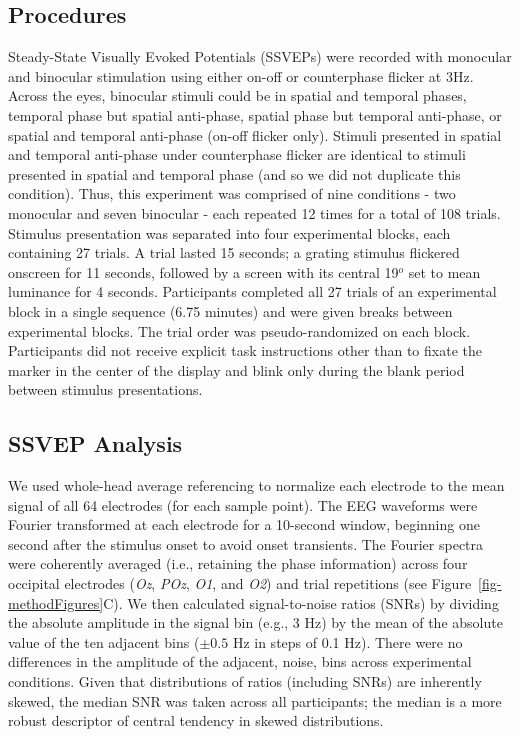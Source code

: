 \documentclass[review,
  12pt,
]{elsarticle}
\begin{document}
\subsection{Procedures}\label{procedures}

Steady-State Visually Evoked Potentials (SSVEPs) were recorded with
monocular and binocular stimulation using either on-off or counterphase
flicker at 3Hz. Across the eyes, binocular stimuli could be in spatial
and temporal phases, temporal phase but spatial anti-phase, spatial
phase but temporal anti-phase, or spatial and temporal anti-phase
(on-off flicker only). Stimuli presented in spatial and temporal
anti-phase under counterphase flicker are identical to stimuli presented
in spatial and temporal phase (and so we did not duplicate this
condition). Thus, this experiment was comprised of nine conditions - two
monocular and seven binocular - each repeated 12 times for a total of
108 trials. Stimulus presentation was separated into four experimental
blocks, each containing 27 trials. A trial lasted 15 seconds; a grating
stimulus flickered onscreen for 11 seconds, followed by a screen with
its central 19\(^o\) set to mean luminance for 4 seconds. Participants
completed all 27 trials of an experimental block in a single sequence
(6.75 minutes) and were given breaks between experimental blocks. The
trial order was pseudo-randomized on each block. Participants did not
receive explicit task instructions other than to fixate the marker in
the center of the display and blink only during the blank period between
stimulus presentations.

\subsection{SSVEP Analysis}\label{ssvep-analysis}

We used whole-head average referencing to normalize each electrode to
the mean signal of all 64 electrodes (for each sample point). The EEG
waveforms were Fourier transformed at each electrode for a 10-second
window, beginning one second after the stimulus onset to avoid onset
transients. The Fourier spectra were coherently averaged (i.e.,
retaining the phase information) across four occipital electrodes
(\emph{Oz}, \emph{POz}, \emph{O1}, and \emph{O2}) and trial repetitions
(see Figure~\ref{fig-methodFigures}C). We then calculated
signal-to-noise ratios (SNRs) by dividing the absolute amplitude in the
signal bin (e.g., 3 Hz) by the mean of the absolute value of the ten
adjacent bins (\(\pm 0.5\) Hz in steps of 0.1 Hz). There were no
differences in the amplitude of the adjacent, noise, bins across
experimental conditions. Given that distributions of ratios (including
SNRs) are inherently skewed, the median SNR was taken across all
participants; the median is a more robust descriptor of central tendency
in skewed distributions.
\end{document}
